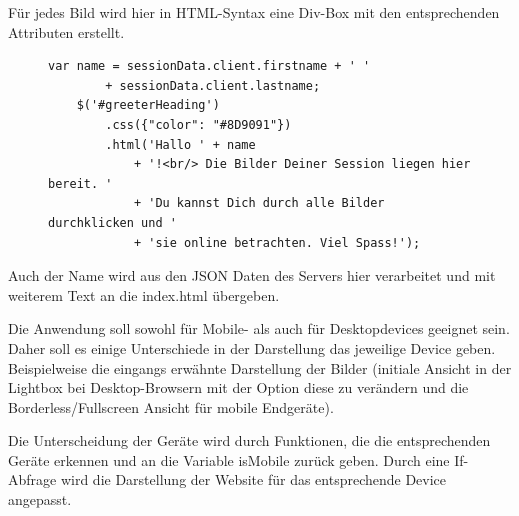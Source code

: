 Für jedes Bild wird hier in HTML-Syntax eine Div-Box mit den entsprechenden Attributen erstellt. 

\begin{figure}[h]
	\begin{lstlisting}[caption={Auszug aus app.js (Webclient)}, label=list_client]
	var name = sessionData.client.firstname + ' ' 
		+ sessionData.client.lastname;
	$('#greeterHeading')
		.css({"color": "#8D9091"})
		.html('Hallo ' + name 
			+ '!<br/> Die Bilder Deiner Session liegen hier bereit. ' 
			+ 'Du kannst Dich durch alle Bilder durchklicken und '
			+ 'sie online betrachten. Viel Spass!');
	\end{lstlisting}
\end{figure}


Auch der Name wird aus den JSON Daten des Servers hier verarbeitet und mit weiterem Text an die index.html übergeben. 

Die Anwendung soll sowohl für Mobile- als auch für Desktopdevices geeignet sein. Daher soll es einige Unterschiede in der Darstellung das jeweilige Device geben. Beispielweise die eingangs erwähnte Darstellung der Bilder (initiale Ansicht in der Lightbox bei Desktop-Browsern mit der Option diese zu verändern und die Borderless/Fullscreen Ansicht für mobile Endgeräte). 

Die Unterscheidung der Geräte wird durch Funktionen, die die entsprechenden Geräte erkennen und an die Variable isMobile zurück geben. Durch eine If-Abfrage wird die Darstellung der Website für das entsprechende Device angepasst.

